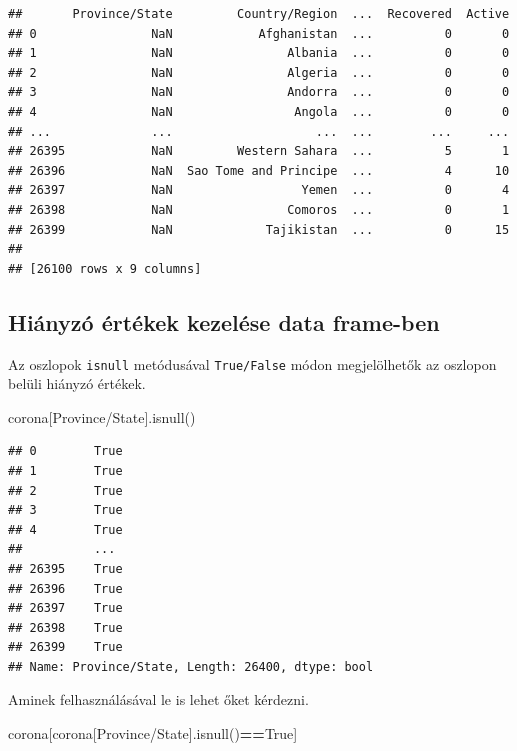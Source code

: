 \documentclass[
]{book}
\newenvironment{Shaded}{\begin{snugshade}}{\end{snugshade}}
\newcommand{\NormalTok}[1]{#1}
\newcommand{\OperatorTok}[1]{\textcolor[rgb]{0.81,0.36,0.00}{\textbf{#1}}}
\newcommand{\StringTok}[1]{\textcolor[rgb]{0.31,0.60,0.02}{#1}}
\newcommand{\VariableTok}[1]{\textcolor[rgb]{0.00,0.00,0.00}{#1}}
\begin{document}
\begin{verbatim}
##       Province/State         Country/Region  ...  Recovered  Active
## 0                NaN            Afghanistan  ...          0       0
## 1                NaN                Albania  ...          0       0
## 2                NaN                Algeria  ...          0       0
## 3                NaN                Andorra  ...          0       0
## 4                NaN                 Angola  ...          0       0
## ...              ...                    ...  ...        ...     ...
## 26395            NaN         Western Sahara  ...          5       1
## 26396            NaN  Sao Tome and Principe  ...          4      10
## 26397            NaN                  Yemen  ...          0       4
## 26398            NaN                Comoros  ...          0       1
## 26399            NaN             Tajikistan  ...          0      15
## 
## [26100 rows x 9 columns]
\end{verbatim}

\subsection{Hiányzó értékek kezelése data frame-ben}\label{hiuxe1nyzuxf3-uxe9rtuxe9kek-kezeluxe9se-data-frame-ben}

Az oszlopok \texttt{isnull} metódusával \texttt{True/False} módon megjelölhetők az oszlopon belüli hiányzó értékek.

\begin{Shaded}
\begin{Highlighting}[]
\NormalTok{corona[}\StringTok{\textquotesingle{}Province/State\textquotesingle{}}\NormalTok{].isnull()}
\end{Highlighting}
\end{Shaded}

\begin{verbatim}
## 0        True
## 1        True
## 2        True
## 3        True
## 4        True
##          ... 
## 26395    True
## 26396    True
## 26397    True
## 26398    True
## 26399    True
## Name: Province/State, Length: 26400, dtype: bool
\end{verbatim}

Aminek felhasználásával le is lehet őket kérdezni.

\begin{Shaded}
\begin{Highlighting}[]
\NormalTok{corona[corona[}\StringTok{\textquotesingle{}Province/State\textquotesingle{}}\NormalTok{].isnull()}\OperatorTok{==}\VariableTok{True}\NormalTok{]}
\end{Highlighting}
\end{Shaded}
\end{document}
